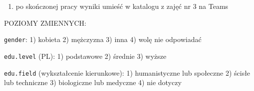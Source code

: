 \documentclass[
]{article}
\providecommand{\tightlist}{%
  \setlength{\itemsep}{0pt}\setlength{\parskip}{0pt}}
\begin{document}
\begin{enumerate}
\def\labelenumi{\alph{enumi})}
\setcounter{enumi}{6}
\tightlist
\item
  po skończonej pracy wyniki umieść w katalogu z zajęć nr 3 na Teams
\end{enumerate}

POZIOMY ZMIENNYCH:

\texttt{gender}: 1) kobieta 2) mężczyzna 3) inna 4) wolę nie odpowiadać

\texttt{edu.level} (PL): 1) podstawowe 2) średnie 3) wyższe

\texttt{edu.field} (wykształcenie kierunkowe): 1) humanistyczne lub
społeczne 2) ścisłe lub techniczne 3) biologiczne lub medyczne 4) nie
dotyczy
\end{document}
